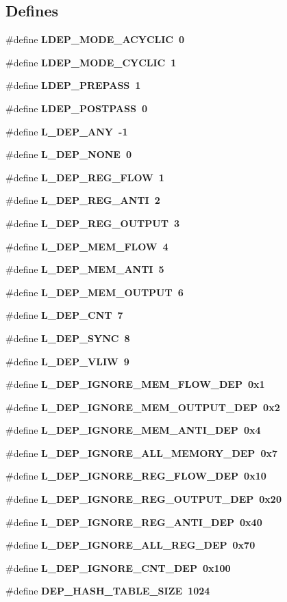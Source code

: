 \subsection*{Defines}
\begin{CompactItemize}
\item 
\#define \bf{LDEP\_\-MODE\_\-ACYCLIC}~0
\item 
\#define \bf{LDEP\_\-MODE\_\-CYCLIC}~1
\item 
\#define \bf{LDEP\_\-PREPASS}~1
\item 
\#define \bf{LDEP\_\-POSTPASS}~0
\item 
\#define \bf{L\_\-DEP\_\-ANY}~-1
\item 
\#define \bf{L\_\-DEP\_\-NONE}~0
\item 
\#define \bf{L\_\-DEP\_\-REG\_\-FLOW}~1
\item 
\#define \bf{L\_\-DEP\_\-REG\_\-ANTI}~2
\item 
\#define \bf{L\_\-DEP\_\-REG\_\-OUTPUT}~3
\item 
\#define \bf{L\_\-DEP\_\-MEM\_\-FLOW}~4
\item 
\#define \bf{L\_\-DEP\_\-MEM\_\-ANTI}~5
\item 
\#define \bf{L\_\-DEP\_\-MEM\_\-OUTPUT}~6
\item 
\#define \bf{L\_\-DEP\_\-CNT}~7
\item 
\#define \bf{L\_\-DEP\_\-SYNC}~8
\item 
\#define \bf{L\_\-DEP\_\-VLIW}~9
\item 
\#define \bf{L\_\-DEP\_\-IGNORE\_\-MEM\_\-FLOW\_\-DEP}~0x1
\item 
\#define \bf{L\_\-DEP\_\-IGNORE\_\-MEM\_\-OUTPUT\_\-DEP}~0x2
\item 
\#define \bf{L\_\-DEP\_\-IGNORE\_\-MEM\_\-ANTI\_\-DEP}~0x4
\item 
\#define \bf{L\_\-DEP\_\-IGNORE\_\-ALL\_\-MEMORY\_\-DEP}~0x7
\item 
\#define \bf{L\_\-DEP\_\-IGNORE\_\-REG\_\-FLOW\_\-DEP}~0x10
\item 
\#define \bf{L\_\-DEP\_\-IGNORE\_\-REG\_\-OUTPUT\_\-DEP}~0x20
\item 
\#define \bf{L\_\-DEP\_\-IGNORE\_\-REG\_\-ANTI\_\-DEP}~0x40
\item 
\#define \bf{L\_\-DEP\_\-IGNORE\_\-ALL\_\-REG\_\-DEP}~0x70
\item 
\#define \bf{L\_\-DEP\_\-IGNORE\_\-CNT\_\-DEP}~0x100
\item 
\#define \bf{DEP\_\-HASH\_\-TABLE\_\-SIZE}~1024
\item 

\end{CompactItemize}
